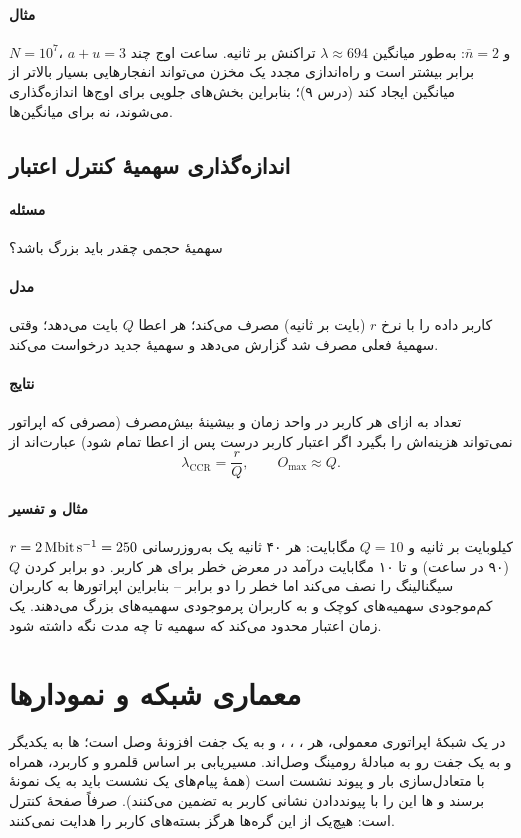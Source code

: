 \documentclass[11pt,a4paper]{article}
\begin{document}
\paragraph{مثال} $N = 10^7$، $a+u = 3$ و $\bar n = 2$: به‌طور میانگین $\lambda \approx 694$ تراکنش بر ثانیه. ساعت اوج
چند برابر بیشتر است و راه‌اندازی مجدد یک مخزن  می‌تواند انفجارهایی بسیار بالاتر از میانگین ایجاد کند (درس ۹)؛
بنابراین بخش‌های جلویی  برای اوج‌ها اندازه‌گذاری می‌شوند، نه برای میانگین‌ها.

\subsection{اندازه‌گذاری سهمیهٔ کنترل اعتبار}\label{sec:quota}
\paragraph{مسئله} سهمیهٔ حجمی  چقدر باید بزرگ باشد؟
\paragraph{مدل} کاربر داده را با نرخ $r$ (بایت بر ثانیه) مصرف می‌کند؛ هر اعطا $Q$ بایت می‌دهد؛  وقتی سهمیهٔ
فعلی مصرف شد گزارش می‌دهد و سهمیهٔ جدید درخواست می‌کند.
\paragraph{نتایج} تعداد  به ازای هر کاربر در واحد زمان و بیشینهٔ بیش‌مصرف (مصرفی که اپراتور نمی‌تواند
هزینه‌اش را بگیرد اگر اعتبار کاربر درست پس از اعطا تمام شود) عبارت‌اند از
\begin{equation}\label{eq:quota}
  \lambda_{\mathrm{CCR}} = \frac{r}{Q}, \qquad O_{\max} \approx Q .
\end{equation}
\paragraph{مثال و تفسیر} $r = \qty{2}{\mega\bit\per\second} = 250$ کیلوبایت بر ثانیه و $Q = 10$ مگابایت: هر ۴۰ ثانیه یک
به‌روزرسانی (۹۰ در ساعت) و تا ۱۰ مگابایت درآمد در معرض خطر برای هر کاربر. دو برابر کردن $Q$ سیگنالینگ را نصف می‌کند
اما خطر را دو برابر -- بنابراین اپراتورها به کاربران کم‌موجودی سهمیه‌های کوچک و به کاربران پرموجودی سهمیه‌های بزرگ
می‌دهند. یک زمان اعتبار محدود می‌کند که سهمیه تا چه مدت نگه داشته شود.

\section{معماری شبکه و نمودارها}
در یک شبکهٔ اپراتوری معمولی، هر ، ، ،  و  به یک جفت افزونهٔ
 وصل است؛ ها به یکدیگر و به یک جفت  رو به مبادلهٔ رومینگ وصل‌اند. مسیریابی بر اساس قلمرو و
کاربرد، همراه با متعادل‌سازی بار و پیوند نشست است (همهٔ پیام‌های یک نشست  باید به یک نمونهٔ 
برسند و ها این را با پیونددادن نشانی  کاربر به  تضمین می‌کنند).  صرفاً صفحهٔ
کنترل است: هیچ‌یک از این گره‌ها هرگز بسته‌های کاربر را هدایت نمی‌کنند.
\end{document}
